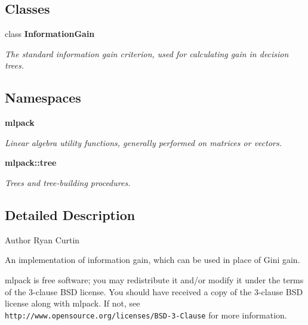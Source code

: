 \subsection*{Classes}
\begin{DoxyCompactItemize}
\item 
class \textbf{ Information\+Gain}
\begin{DoxyCompactList}\small\item\em The standard information gain criterion, used for calculating gain in decision trees. \end{DoxyCompactList}\end{DoxyCompactItemize}
\subsection*{Namespaces}
\begin{DoxyCompactItemize}
\item 
 \textbf{ mlpack}
\begin{DoxyCompactList}\small\item\em Linear algebra utility functions, generally performed on matrices or vectors. \end{DoxyCompactList}\item 
 \textbf{ mlpack\+::tree}
\begin{DoxyCompactList}\small\item\em Trees and tree-\/building procedures. \end{DoxyCompactList}\end{DoxyCompactItemize}


\subsection{Detailed Description}
\begin{DoxyAuthor}{Author}
Ryan Curtin
\end{DoxyAuthor}
An implementation of information gain, which can be used in place of Gini gain.

mlpack is free software; you may redistribute it and/or modify it under the terms of the 3-\/clause B\+SD license. You should have received a copy of the 3-\/clause B\+SD license along with mlpack. If not, see {\tt http\+://www.\+opensource.\+org/licenses/\+B\+S\+D-\/3-\/\+Clause} for more information. 